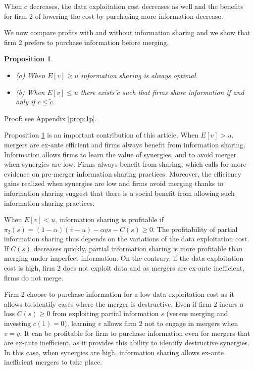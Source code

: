 \documentclass[a4paper,leqno]{article}%
\newtheorem{prop}{Proposition}
\renewcommand{\a}{\alpha}
\newcommand{\uv}{\underline{v}}
\newcommand{\ov}{\overline{v}}
\begin{document}
\noindent When $c$ decreases, the data exploitation cost decreases as well and the benefits for firm 2 of lowering the cost by purchasing more information decrease.

\medskip

We now compare profits with and without information sharing and we show that firm 2 prefers to purchase information before merging.

\begin{prop}~~\label{prop:1}

\begin{itemize}
    \item (a) When $E[v]\geq u$ information sharing is always optimal.
    \item (b) When $E[v]\leq u$ there exists $\tilde{c}$ such that firms share information if and only if $c\leq \tilde{c}$.
\end{itemize} 

\end{prop}

\noindent Proof: see Appendix \ref{prop:1p}.

\medskip

\noindent Proposition \ref{prop:1} is an important contribution of this article. When $E[v]>u$, mergers are ex-ante efficient and firms always benefit from information sharing. Information allows firms to learn the value of synergies, and to avoid merger when synergies are low. Firms always benefit from sharing, which calls for more evidence on pre-merger information sharing practices. Moreover, the efficiency gains realized when synergies are low and firms avoid merging thanks to information sharing suggest that there is a social benefit from allowing such information sharing practices. 

\medskip

When $E[v]<u$, information sharing is profitable if $\pi_2(s)=(1-\a)(\ov -u)-\a \uv s-C(s)\geq0$. The profitability of partial information sharing thus depends on the variations of the data exploitation cost. If $C(s)$ decreases quickly, partial information sharing is more profitable than merging under imperfect information. On the contrary, if the data exploitation cost is high, firm 2 does not exploit data and as mergers are ex-ante inefficient, firms do not merge. 

\medskip

Firm 2 choose to purchase information for a low data exploitation cost as it allows to identify cases where the merger is destructive. Even if firm 2 incurs a loss $C(s)\geq 0$ from exploiting partial information $s$ (versus merging and investing $c(1)=0$), learning $v$ allows firm 2 not to engage in mergers when $v=\uv$. It can be profitable for firm to purchase information even for mergers that are ex-ante inefficient, as it provides this ability to identify destructive synergies. In this case, when synergies are high, information sharing allows ex-ante inefficient mergers to take place. 
 
\end{document}
